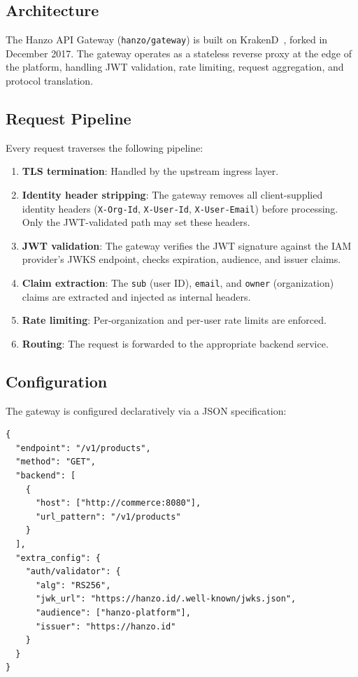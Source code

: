 \documentclass[11pt,a4paper]{article}
\begin{document}
\subsection{Architecture}

The Hanzo API Gateway (\texttt{hanzo/gateway}) is built on KrakenD~\cite{krakend2017}, forked in December 2017. The gateway operates as a stateless reverse proxy at the edge of the platform, handling JWT validation, rate limiting, request aggregation, and protocol translation.

\subsection{Request Pipeline}

Every request traverses the following pipeline:

\begin{enumerate}
    \item \textbf{TLS termination}: Handled by the upstream ingress layer.
    \item \textbf{Identity header stripping}: The gateway removes all client-supplied identity headers (\texttt{X-Org-Id}, \texttt{X-User-Id}, \texttt{X-User-Email}) before processing. Only the JWT-validated path may set these headers.
    \item \textbf{JWT validation}: The gateway verifies the JWT signature against the IAM provider's JWKS endpoint, checks expiration, audience, and issuer claims.
    \item \textbf{Claim extraction}: The \texttt{sub} (user ID), \texttt{email}, and \texttt{owner} (organization) claims are extracted and injected as internal headers.
    \item \textbf{Rate limiting}: Per-organization and per-user rate limits are enforced.
    \item \textbf{Routing}: The request is forwarded to the appropriate backend service.
\end{enumerate}

\subsection{Configuration}

The gateway is configured declaratively via a JSON specification:

\begin{lstlisting}[caption=Gateway endpoint configuration.]
{
  "endpoint": "/v1/products",
  "method": "GET",
  "backend": [
    {
      "host": ["http://commerce:8080"],
      "url_pattern": "/v1/products"
    }
  ],
  "extra_config": {
    "auth/validator": {
      "alg": "RS256",
      "jwk_url": "https://hanzo.id/.well-known/jwks.json",
      "audience": ["hanzo-platform"],
      "issuer": "https://hanzo.id"
    }
  }
}
\end{lstlisting}
\end{document}
